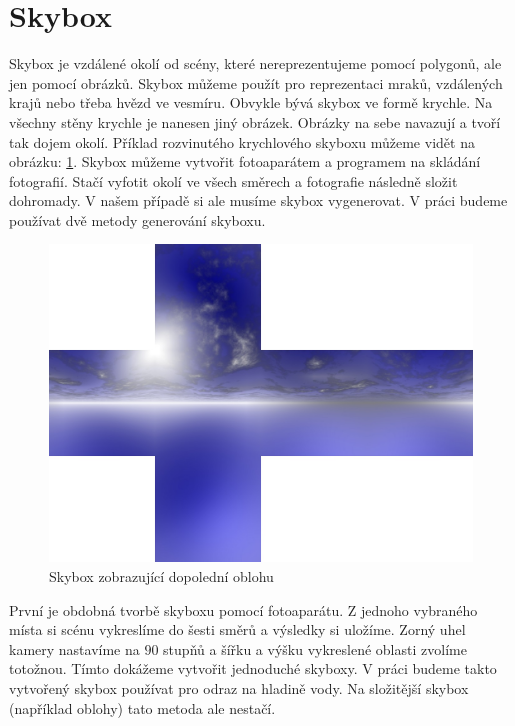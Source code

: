 
\section{Skybox}

Skybox je vzdálené okolí od scény, které nereprezentujeme pomocí polygonů, ale jen pomocí obrázků.
Skybox můžeme použít pro reprezentaci mraků, vzdálených krajů nebo třeba hvězd ve vesmíru.
Obvykle bývá skybox ve formě krychle.
Na všechny stěny krychle je nanesen jiný obrázek.
Obrázky na sebe navazují a tvoří tak dojem okolí.
Příklad roz\-vi\-nu\-té\-ho krychlového skyboxu můžeme vidět na obrázku: \ref{fig:skybox0}.
Skybox můžeme vytvořit fotoaparátem a programem na skládání fotografií.
Stačí vyfotit okolí ve všech směrech a fotografie následně složit dohromady.
V našem případě si ale musíme skybox vygenerovat.
V práci budeme používat dvě metody generování skyboxu.
\begin{figure}[h]
\centering
\includegraphics[width=15cm,keepaspectratio]{obr/skybox0.jpg}
\caption{Skybox zobrazující dopolední oblohu}
\label{fig:skybox0}
\end{figure}


První je obdobná tvorbě skyboxu pomocí fotoaparátu.
Z jednoho vybraného místa si scénu vykreslíme do šesti směrů a výsledky si uložíme.
Zorný uhel kamery nastavíme na $90$ stupňů a šířku a výšku vykreslené oblasti zvolíme totožnou.
Tímto dokážeme vytvořit jednoduché skyboxy. V práci budeme takto vytvořený skybox používat pro odraz na hladině vody.
Na složitější skybox (například oblohy) tato metoda ale nestačí.

